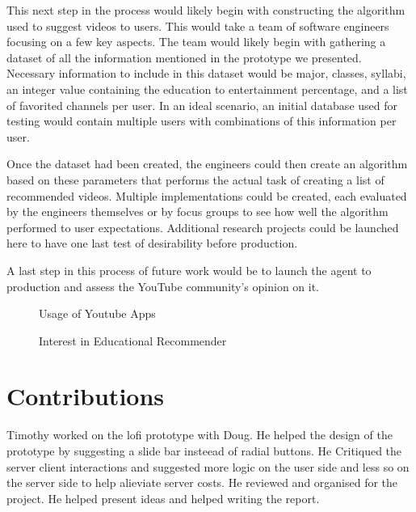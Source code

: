 \documentclass[letterpaper]{article} %
\begin{document}
This next step in the process would likely begin with constructing the algorithm used to suggest videos to users. This would take a team of software engineers focusing on a few key aspects. The team would likely begin with gathering a dataset of all the information mentioned in the prototype we presented. Necessary information to include in this dataset would be major, classes, syllabi, an integer value containing the education to entertainment percentage, and a list of favorited channels per user. In an ideal scenario, an initial database used for testing would contain multiple users with combinations of this information per user.


Once the dataset had been created, the engineers could then create an algorithm based on these parameters that performs the actual task of creating a list of recommended videos. Multiple implementations could be created, each evaluated by the engineers themselves or by focus groups to see how well the algorithm performed to user expectations. Additional research projects could be launched here to have one last test of desirability before production.


A last step in this process of future work would be to launch the agent to production and assess the YouTube community’s opinion on it.

 
\begin{figure}[h]
	\caption{Usage of Youtube Apps}
	\label{fig:AppsPie}
	\center
\end{figure}


\begin{figure}[h]
	\center
	\caption{Interest in Educational Recommender}
	\label{fig:InterestPie}
\end{figure}



\section{Contributions}

Timothy worked on the lofi prototype with Doug. He helped the design of the prototype by suggesting a slide bar insteead of radial buttons. He Critiqued the server client interactions and suggested more logic on the user side and less so on the server side to help alieviate server costs. He reviewed and organised for the project. He helped present ideas and helped writing the report. 
\end{document}
